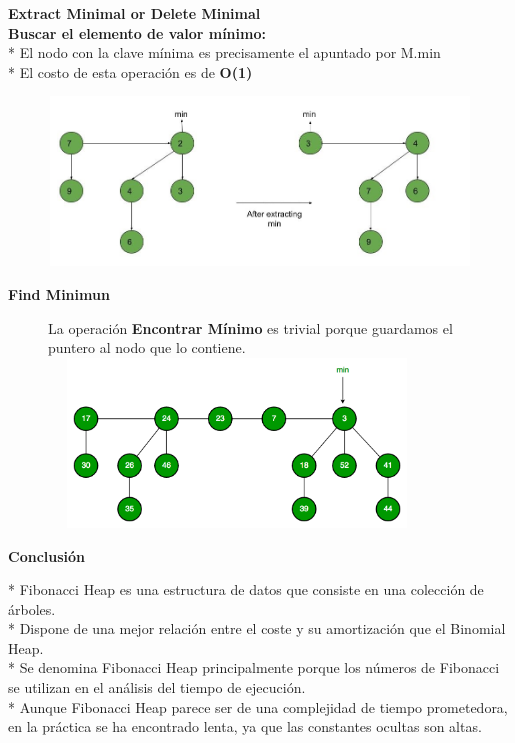 \documentclass[11pt]{beamer}
\begin{document}
\begin{frame}{\bf \large {}}

{\center \bf \large \color{red} Extract Minimal or Delete Minimal \\}
	{\bf Buscar el elemento de valor mínimo:}\\
	* El nodo con la clave m\'inima es precisamente el apuntado por M.min \\
	* El costo de esta operación es de {\bf O(1)}
	
\begin{figure}[center]
  \includegraphics[width=12cm, height=4.5cm]{Img/EMinimo.jpg}
\end{figure}
\end{frame}

\begin{frame}{\bf \large {}}

{\center \bf \large \color{red} Find Minimun \\}
\begin{figure}[center]
	La operación {\bf Encontrar Mínimo} es trivial porque guardamos el puntero al nodo que lo contiene.
  \includegraphics[width=10cm, height=4.5cm]{Img/BMinimo.png}
\end{figure}

\end{frame}

\begin{frame}{\bf \large {}}

{\center \bf \huge \color{red} Conclusi\'on \\}

	* Fibonacci Heap es una estructura de datos que consiste en una colección de árboles.\\
	* Dispone de una mejor relación entre el coste y su amortización que el Binomial Heap.\\
	* Se denomina Fibonacci Heap principalmente porque los números de Fibonacci se utilizan en el análisis del tiempo de ejecución.\\
	* Aunque Fibonacci Heap parece ser de una complejidad de tiempo prometedora, en la práctica se ha encontrado lenta, ya que las constantes ocultas son altas.\\
\end{frame}
\end{document}
